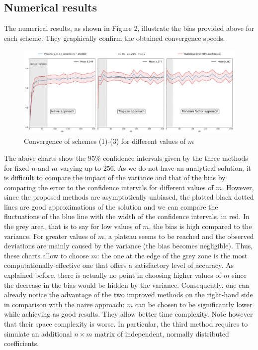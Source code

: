 \documentclass{article}
\begin{document}
\subsection*{Numerical results}

The numerical results, as shown in Figure 2, illustrate the bias provided above for each scheme.
They graphically confirm the obtained convergence speeds.

\begin{figure}[H]
  \hspace*{-0.025\linewidth}\includegraphics[width=1.04\textwidth]{charts/cvgce_wo_control.png}
  \caption{Convergence of schemes (1)-(3) for different values of $m$}
\end{figure}

The above charts show the $95\%$ confidence intervals given by the three methods for fixed $n$ and $m$
varying up to $256$. As we do not have an analytical solution, it is difficult to compare the impact of the variance and that
of the bias by comparing the error to the confidence intervals for different values of $m$. However, since the proposed
methods are asymptotically unbiased, the plotted black dotted lines are good approximations of the solution and we
can compare the fluctuations of the blue line with the width of the confidence intervals, in red. In the grey area,
that is to say for low values of $m$, the bias is high compared to the variance. For greater values of $m$, a plateau
seems to be reached and the observed deviations are mainly caused by the variance (the bias becomes negligible).
Thus, these charts allow
to choose $m$: the one at the edge of the grey zone is the most computationally-effective one that offers a satisfactory
level of accuracy. As explained before, there is actually no point in choosing higher values of $m$ since the decrease in
the bias would be hidden by the variance. Consequently, one can already notice the advantage of the two improved
methods on the right-hand side in comparison with the naive approach: $m$ can be chosen to be significantly lower
while achieving as good results. They allow better time complexity. Note however that their space complexity is worse.
In particular, the third method requires to simulate an additional $n \times m$ matrix of independent, normally
distributed coefficients.
\end{document}
